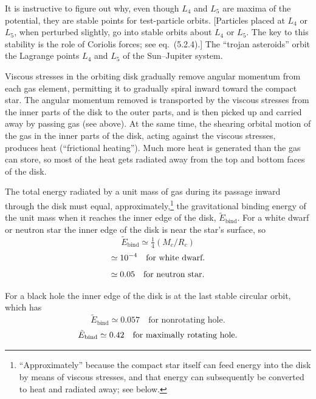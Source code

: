 It is instructive to figure out why, even though $L_4$ and $L_5$ are maxima
of the potential, they are stable points for test-particle orbits.
[Particles placed at $L_4$ or $L_5$, when perturbed slightly, go into
stable orbits about $L_4$ or $L_5$.  The key to this stability is the role
of Coriolis forces; see eq.~(5.2.4).]  The ``trojan asteroids'' orbit the
Lagrange points $L_4$ and $L_5$ of the Sun--Jupiter system.

Viscous stresses in the orbiting disk gradually remove angular momentum
from each gas element, permitting it to gradually spiral inward toward the
compact star. The angular momentum removed is transported by the viscous
stresses from the inner parts of the disk to the outer parts, and is then picked
up and carried away by passing gas (see above). At the same time, the shearing
orbital motion of the gas in the inner parts of the disk, acting against the
viscous stresses, produces heat (``frictional heating''). Much more heat is
generated than the gas can store, so most of the heat gets radiated away from
the top and bottom faces of the disk.

The total energy radiated by a unit mass of gas during its passage inward
through the disk must equal, approximately,\footnote{``Approximately'' because the compact star itself can feed energy into the disk by means
of viscous stresses, and that energy can subsequently be converted to heat and radiated
away; see below.} the gravitational binding energy
of the unit mass when it reaches the inner edge of the disk, $\tilde{E}_{\text{bind}}$. For a white
dwarf or neutron star the inner edge of the disk is near the star's surface, so
\begin{equation}
\tilde{E}_{\text{bind}} \simeq \tfrac{1}{4}(M_c/R_c)
\tag{5.2.9a}
\end{equation}
\begin{equation}
\simeq 10^{-4} \quad \text{for white dwarf}.
\notag
\end{equation}
\begin{equation}
\simeq 0.05 \quad \text{for neutron star}.
\notag
\end{equation}

For a black hole the inner edge of the disk is at the last stable circular orbit,
which has
\begin{equation}
\tilde{E}_{\text{bind}} \simeq 0.057 \quad \text{for nonrotating hole}.
\tag{5.2.9b}
\end{equation}
\begin{equation}
\tilde{E}_{\text{bind}} \simeq 0.42 \quad \text{for maximally rotating hole}.
\notag
\end{equation}

